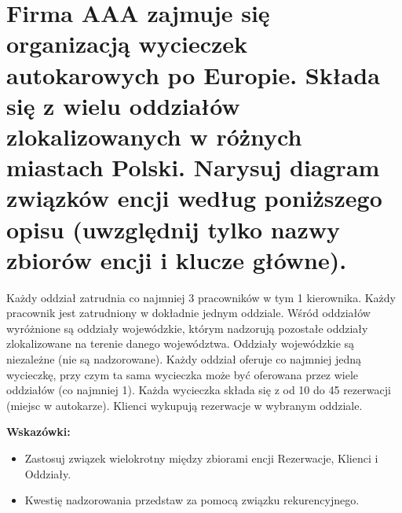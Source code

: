 \documentclass[a4paper,11pt]{article}
\begin{document}
\vspace{3cm}



\newpage
\section{Firma AAA zajmuje się organizacją wycieczek autokarowych po Europie. Składa się z wielu oddziałów zlokalizowanych w różnych miastach Polski. Narysuj diagram związków encji według poniższego opisu (uwzględnij tylko nazwy zbiorów encji i klucze główne).}

Każdy oddział zatrudnia co najmniej 3 pracowników w tym 1 kierownika. Każdy pracownik jest zatrudniony w dokładnie jednym oddziale. Wśród oddziałów wyróżnione są oddziały wojewódzkie, którym nadzorują pozostałe oddziały zlokalizowane na terenie danego województwa. Oddziały wojewódzkie są niezależne (nie są nadzorowane). Każdy oddział oferuje co najmniej jedną wycieczkę, przy czym ta sama wycieczka może być oferowana przez wiele oddziałów (co najmniej 1). Każda wycieczka składa się z od 10 do 45 rezerwacji (miejsc w autokarze). Klienci wykupują rezerwacje w wybranym oddziale.

\vspace{5mm}

\textbf{Wskazówki:}
\begin{itemize}
	\item Zastosuj związek wielokrotny między zbiorami encji Rezerwacje, Klienci i Oddziały.
    \item Kwestię nadzorowania przedstaw za pomocą związku rekurencyjnego.
\end{itemize}

\vspace{3cm}



\newpage
\end{document}
